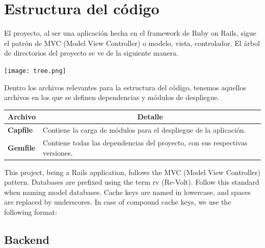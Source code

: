\newpage

\section{Estructura del código}
El proyecto, al ser una aplicación hecha en el framework de Ruby on Rails, sigue el patrón de MVC (Model View Controller) o modelo, vista, controlador. El árbol de directorios del proyecto se ve de la siguiente manera.

\begin{center}
  \texttt{[image: tree.png]} \\
\end{center}

Dentro los archivos relevantes para la estructura del código, tenemos aquellos archivos en los que se definen dependencias y módulos de despliegue.

\begin{center}
  \begin{tabular}{ | l | p{12.5cm} |}
    \hline
    \multicolumn{1}{|c|}{\textbf{Archivo}} & \multicolumn{1}{|c|}{\textbf{Detalle}} \\
    \hline
    
    {\textbf{Capfile}} & Contiene la carga de módulos para el despliegue de la aplicación. \\ \hline
    {\textbf{Gemfile}} & Contiene todas las dependencias del proyecto, con sus respectivas versiones. \\ \hline
  \end{tabular}
\end{center}


This project, being a Rails application, follows the MVC (Model View Controller) pattern.
Databases are prefixed using the term rv (Re-Volt). Follow this standard when naming model databases.
Cache keys are named in lowercase, and spaces are replaced by underscores. In case of compound cache keys, we use the following format:


\subsection{Backend}

